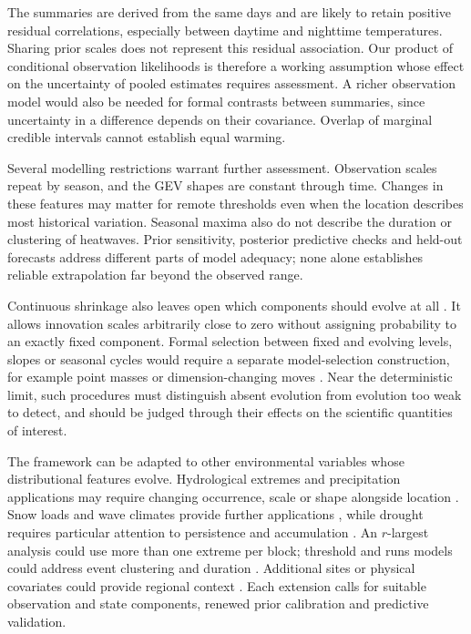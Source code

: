 \documentclass[11pt,a4paper]{article}
\begin{document}
	The summaries are derived from the same days and are likely to retain
positive residual correlations, especially between daytime and nighttime
temperatures. Sharing prior scales does not represent this residual
association. Our product of conditional observation likelihoods is therefore
a working assumption whose effect on the uncertainty of pooled estimates
requires assessment. A richer observation model would also be needed for
formal contrasts between summaries, since uncertainty in a difference
depends on their covariance. Overlap of marginal credible intervals cannot
establish equal warming.
	
	Several modelling restrictions warrant further assessment. Observation
	scales repeat by season, and the GEV shapes are constant through time.
	Changes in these features may matter for remote thresholds even when the
	location describes most historical variation. Seasonal maxima also do not
	describe the duration or clustering of heatwaves. Prior sensitivity,
	posterior predictive checks and held-out forecasts address different parts
	of model adequacy; none alone establishes reliable extrapolation far beyond
	the observed range.
	
	Continuous shrinkage also leaves open which components should evolve at
	all \citep{slater2020}. It allows innovation scales arbitrarily close to
	zero without assigning probability to an exactly fixed component. Formal
	selection between fixed and evolving levels, slopes or seasonal cycles
	would require a separate model-selection construction, for example point
	masses or dimension-changing moves
	\citep{fruhwirthschnatter2010,cadonna2020,green1995}. Near the deterministic
	limit, such procedures must distinguish absent evolution from evolution
	too weak to detect, and should be judged through their effects on the
	scientific quantities of interest.
	
	The framework can be adapted to other environmental variables whose
	distributional features evolve. Hydrological extremes
	\citep{katz2002} and precipitation applications may require changing
	occurrence, scale or shape alongside location
	\citep{asadieh2015,westra2013,bhatia2019,gu2017,jorgensen2024,jayaweera2025,razighalavand2025}.
	Snow loads and wave climates provide further applications
	\citep{leroux2022,wang2004}, while drought requires particular attention
	to persistence and accumulation \citep{vanloon2015}. An \(r\)-largest
	analysis could use more than one extreme per block; threshold and runs
	models could address event clustering and duration \citep{coles2001}.
	Additional sites or physical covariates could provide regional context
	\citep{scott2014}. Each extension calls for suitable observation and state
	components, renewed prior calibration and predictive validation.
	
\end{document}
